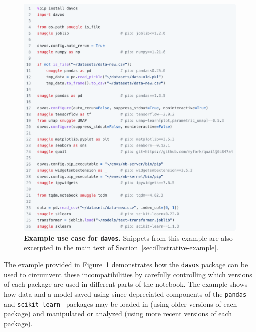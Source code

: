 \documentclass[preprint,12pt,a4paper]{elsarticle}
\begin{document}
\begin{figure}[tp]
\centering
\includegraphics[width=\textwidth]{figs/illustrative_example}
\caption{\small \textbf{Example use case for \texttt{davos}.}
  Snippets from this example are also excerpted in the main text of
  Section~\ref{sec:illustrative-example}.}
\label{fig:illustrative-example}
\end{figure}

The example provided in Figure~\ref{fig:illustrative-example}
demonstrates how the \texttt{davos} package can be used to circumvent
these incompatibilities by carefully controlling which versions of
each package are used in different parts of the notebook.  The example
shows how data and a model saved using since-depreciated components of
the \texttt{pandas} and \texttt{scikit-learn}~\cite{PedrEtal11}
packages may be loaded in (using older versions of each package) and
manipulated or analyzed (using more recent versions of each package).
\end{document}
